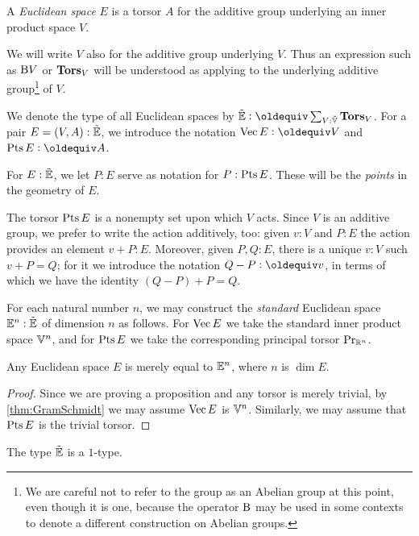 \begin{definition}\label{def:EuclideanSpace}
  A {\em Euclidean space} $E$ is a torsor $A$ for the additive group
  underlying an inner product space $V$.
\end{definition}

We will write $V$ also for the additive group underlying $V$.  Thus an
expression such as $\mathrm B V$ or $\mathbf{Tors}_V$ will be understood as applying to
the underlying additive group\footnote{We are careful not to refer to the group
  as an Abelian group at this point, even though it is one, because the
  operator $\mathrm B$ may be used in some contexts to denote a different construction
  on Abelian groups.}
of $V$.

We denote the type of all Euclidean spaces by $\ES \defeq \sum_{V:\OS} \typetorsor_V$.
For a pair $E = (V,A) : {\tilde {\mathbb E}}$, we introduce the notation $\Vectors E \defeq V$ and $\Points E \defeq A$.

For $E:{\tilde {\mathbb E}}$, we let $P:E$ serve as notation for $P:\operatorname{Pts} E$.  These will be
the {\em points} in the geometry of $E$.

The torsor $\operatorname{Pts} E$ is a nonempty set upon which $V$ acts.  Since $V$ is an
additive group, we prefer to write the action additively, too: given $v:V$ and
$P:E$ the action provides an element $v+P:E$.  Moreover, given $P,Q:E$, there
is a unique $v:V$ such $v+P = Q$; for it we introduce the notation $Q-P \defeq
v$, in terms of which we have the identity $(Q-P)+P=Q$.

For each natural number $n$, we may construct the {\em standard} Euclidean
space $\mathbb E^n : {\tilde {\mathbb E}}$ of dimension $n$ as follows.  For $\operatorname{Vec} E$ we take the
standard inner product space $\mathbb V^n$, and for $\operatorname{Pts} E$ we take the
corresponding principal torsor $\mathrm{Pr}_{{\mathbb{R}^n}}$.

\begin{theorem}\label{thm:EuclideanNormalization}
  Any Euclidean space $E$ is merely equal to $\mathbb E^n$, where $n$ is $\dim E$.
\end{theorem}

\begin{proof}
  Since we are proving a proposition and any torsor is merely trivial, by
  \cref{thm:GramSchmidt} we may assume $\operatorname{Vec} E$ is $\mathbb V^n$.  Similarly, we
  may assume that $\operatorname{Pts} E$ is the trivial torsor.
\end{proof}

\begin{lemma}\label{lem:EuclideanSpace1Type}
  The type ${\tilde {\mathbb E}}$ is a $1$-type.
\end{lemma}

